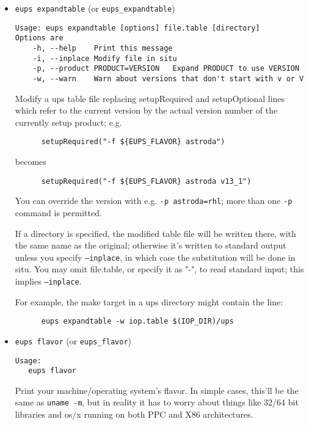 \documentclass{article}
\newcommand{\code}[1]{\texttt{#1}}
\begin{document}
\begin{itemize}

  \item \code{eups expandtable} (or \code{eups\_expandtable})
\begin{verbatim}
Usage: eups expandtable [options] file.table [directory]
Options are
    -h, --help    Print this message
    -i, --inplace Modify file in situ
    -p, --product PRODUCT=VERSION   Expand PRODUCT to use VERSION
    -w, --warn    Warn about versions that don't start with v or V
\end{verbatim}

Modify a ups table file replacing setupRequired and setupOptional
lines which refer to the current version by the actual version number
of the currently setup product; e.g.
\begin{verbatim}
      setupRequired("-f ${EUPS_FLAVOR} astroda")
\end{verbatim}
becomes
\begin{verbatim}
      setupRequired("-f ${EUPS_FLAVOR} astroda v13_1")
\end{verbatim}
You can override the version with e.g. \code{-p astroda=rhl}; more
than one \code{-p} command is permitted.

If a directory is specified, the modified table file will be written
there, with the same name as the original; otherwise it's written to
standard output unless you specify \code{--inplace}, in which case the
substitution will be done in situ.
You may omit file.table, or specify it as "-", to read standard input;
this implies \code{--inplace}.

For example, the make target in a ups directory might contain the line:
\begin{verbatim}
      eups expandtable -w iop.table $(IOP_DIR)/ups
\end{verbatim}				%


\item \code{eups flavor} (or \code{eups\_flavor})
\begin{verbatim}
Usage:
   eups flavor
\end{verbatim}
  
Print your machine/operating system's flavor.  In simple cases, this'll
be the same as \code{uname -m}, but in reality it has to worry about things
like 32/64 bit libraries and os/x running on both PPC and X86 architectures.


\end{itemize}
\end{document}
